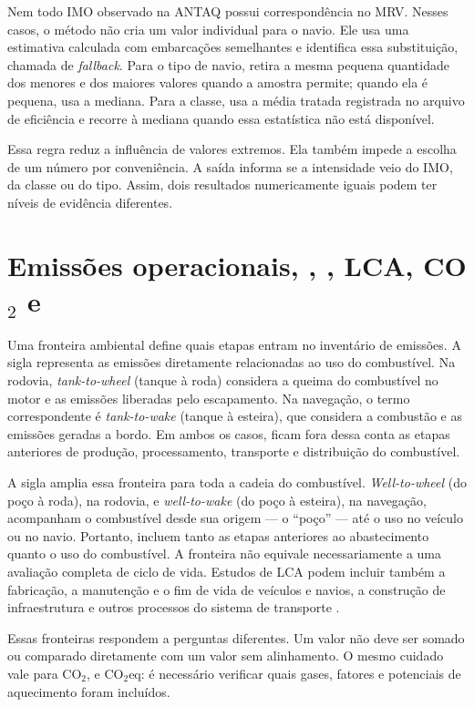Nem todo IMO observado na ANTAQ possui correspondência no MRV. Nesses casos, o método não cria um valor individual para o navio. Ele usa uma estimativa calculada com embarcações semelhantes e identifica essa substituição, chamada de \emph{fallback}. Para o tipo de navio, retira a mesma pequena quantidade dos menores e dos maiores valores quando a amostra permite; quando ela é pequena, usa a mediana. Para a classe, usa a média tratada registrada no arquivo de eficiência e recorre à mediana quando essa estatística não está disponível.

Essa regra reduz a influência de valores extremos. Ela também impede a escolha de um número por conveniência. A saída informa se a intensidade veio do IMO, da classe ou do tipo. Assim, dois resultados numericamente iguais podem ter níveis de evidência diferentes.

\section{Emissões operacionais, \ttw{}, \wtw{}, LCA, CO$_2$ e \cooe{}}
\label{sec:fronteiras-emissoes-literatura}

Uma fronteira ambiental define quais etapas entram no inventário de emissões. A sigla \ttw{} representa as emissões diretamente relacionadas ao uso do combustível. Na rodovia, \emph{tank-to-wheel} (tanque à roda) considera a queima do combustível no motor e as emissões liberadas pelo escapamento. Na navegação, o termo correspondente é \emph{tank-to-wake} (tanque à esteira), que considera a combustão e as emissões geradas a bordo. Em ambos os casos, ficam fora dessa conta as etapas anteriores de produção, processamento, transporte e distribuição do combustível.

A sigla \wtw{} amplia essa fronteira para toda a cadeia do combustível. \emph{Well-to-wheel} (do poço à roda), na rodovia, e \emph{well-to-wake} (do poço à esteira), na navegação, acompanham o combustível desde sua origem --- o ``poço'' --- até o uso no veículo ou no navio. Portanto, incluem tanto as etapas anteriores ao abastecimento quanto o uso do combustível. A fronteira \wtw{} não equivale necessariamente a uma avaliação completa de ciclo de vida. Estudos de LCA podem incluir também a fabricação, a manutenção e o fim de vida de veículos e navios, a construção de infraestrutura e outros processos do sistema de transporte \cite{decarb2024,maritimelca2024}.

Essas fronteiras respondem a perguntas diferentes. Um valor \ttw{} não deve ser somado ou comparado diretamente com um valor \wtw{} sem alinhamento. O mesmo cuidado vale para CO$_2$, \cooe{} e CO$_2$eq: é necessário verificar quais gases, fatores e potenciais de aquecimento foram incluídos.

